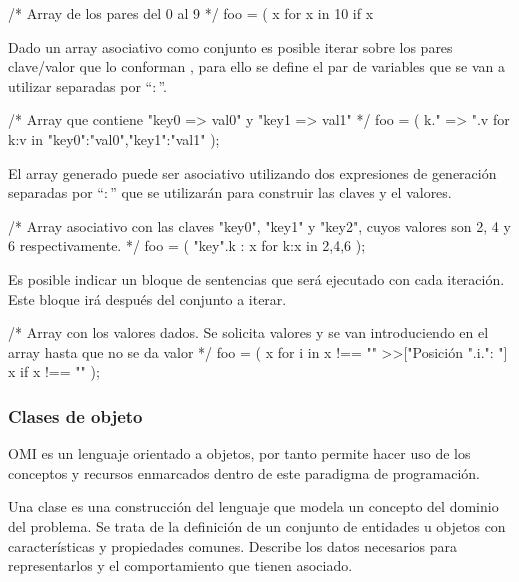 \begin{myverbatim}
   /*
      Array de los pares
      del 0 al 9
   */
   foo = ( x for x in 10 if x %
\end{myverbatim}

Dado un array asociativo como conjunto es posible iterar sobre los pares clave/valor que lo conforman ,
para ello se define el par de variables que se van a utilizar separadas por ``$:$''. \\

\begin{myverbatim}
   /*
      Array que contiene "key0 => val0"
      y "key1 => val1"
   */
   foo = ( k." => ".v for k:v in {"key0":"val0","key1":"val1"} );
\end{myverbatim}

El array generado puede ser asociativo utilizando dos expresiones de generación separadas por 
``$:$'' que se utilizarán para construir las claves y el valores. \\

\begin{myverbatim}
   /*
      Array asociativo con las claves "key0", "key1" y "key2",
      cuyos valores son 2, 4 y 6 respectivamente.
   */
   foo = ( "key".k : x for k:x in {2,4,6} );
\end{myverbatim}

Es posible indicar un bloque de sentencias que será ejecutado 
con cada iteración. Este bloque irá después del conjunto a iterar. \\

\begin{myverbatim}
   /*
      Array con los valores dados.
      Se solicita valores y se van introduciendo
      en el array hasta que no se da valor 
   */
   foo = ( x for i in x !== "" {>>["Posición ".i.": "] x} if x !== "" );
\end{myverbatim}


\subsubsection{Clases de objeto} \label{sec:class}
OMI es un lenguaje orientado a objetos, por tanto permite hacer uso de los conceptos y recursos enmarcados
dentro de este paradigma de programación.

Una clase es una construcción del lenguaje que modela un concepto del dominio del problema. Se trata de la definición de un conjunto de entidades u objetos
con características y propiedades comunes. Describe los datos necesarios para representarlos y el comportamiento que tienen asociado.

